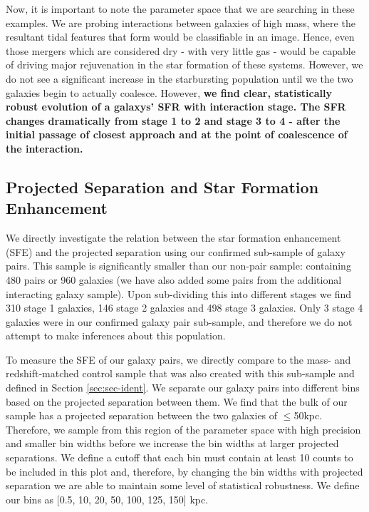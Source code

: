 \documentclass[fleqn,usenatbib]{mnras}
\begin{document}
Now, it is important to note the parameter space that we are searching in these examples. We are probing interactions between galaxies of high mass, where the resultant tidal features that form would be classifiable in an image. Hence, even those mergers which are considered dry - with very little gas - would be capable of driving major rejuvenation in the star formation of these systems. However, we do not see a significant increase in the starbursting population until we the two galaxies begin to actually coalesce. However, \textbf{we find clear, statistically robust evolution of a galaxys' SFR with interaction stage. The SFR changes dramatically from stage 1 to 2 and stage 3 to 4 - after the initial passage of closest approach and at the point of coalescence of the interaction.}

\subsection{Projected Separation and Star Formation Enhancement}
\noindent We directly investigate the relation between the star formation enhancement (SFE) and the projected separation using our confirmed sub-sample of galaxy pairs. This sample is significantly smaller than our non-pair sample: containing 480 pairs or 960 galaxies (we have also added some pairs from the additional interacting galaxy sample). Upon sub-dividing this into different stages we find 310 stage 1 galaxies, 146 stage 2 galaxies and 498 stage 3 galaxies. Only 3 stage 4 galaxies were in our confirmed galaxy pair sub-sample, and therefore we do not attempt to make inferences about this population. 

To measure the SFE of our galaxy pairs, we directly compare to the mass- and redshift-matched control sample that was also created with this sub-sample and defined in Section \ref{sec:sec-ident}. We separate our galaxy pairs into different bins based on the projected separation between them. We find that the bulk of our sample has a projected separation between the two galaxies of $\leq$50kpc. Therefore, we sample from this region of the parameter space with high precision and smaller bin widths before we increase the bin widths at larger projected separations. We define a cutoff that each bin must contain at least 10 counts to be included in this plot and, therefore, by changing the bin widths with projected separation we are able to maintain some level of statistical robustness. We define our bins as [0.5, 10, 20, 50, 100, 125, 150] kpc.
\end{document}
